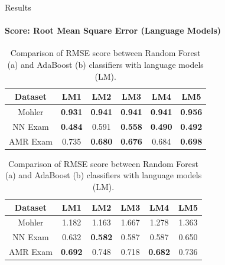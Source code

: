 \documentclass[aspectratio=169]{beamer}
\begin{document}
\begin{frame}{Results}
\framesubtitle{Score: Root Mean Square Error (Language Models)}
\begin{table}
\begin{subtable}[c]{0.5\textwidth}
	\centering
	\begin{tabular}{|c|c|c|c|c|c|}
		\hline
		Dataset & LM1 & LM2 & LM3 & LM4 & LM5 \\
		\hline
		Mohler &\textbf{0.931}& \textbf{0.941}& \textbf{0.941}& \textbf{0.941}& \textbf{0.956}\\
		\hline
		NN Exam &\textbf{0.484}& {0.591}& \textbf{0.558}& \textbf{0.490}& \textbf{0.492}\\
		\hline
		AMR Exam &0.735& \textbf{0.680}& \textbf{0.676}& 0.684& \textbf{0.698}\\
		\hline
	\end{tabular}
	\subcaption{}
\end{subtable}
\begin{subtable}[c]{0.5\textwidth}
	\centering
	\begin{tabular}{|c|c|c|c|c|c|}
		\hline
		Dataset & LM1 & LM2 & LM3 & LM4 & LM5 \\
		\hline
		Mohler &1.182& 1.163& 1.667& 1.278& 1.363 \\
		\hline
		NN Exam &0.632& \textbf{0.582}& 0.587& 0.587& 0.650\\
		\hline
		AMR Exam &\textbf{0.692}& 0.748& 0.718& \textbf{0.682}& 0.736\\
		\hline
	\end{tabular}	
	\subcaption{}
\end{subtable}
\caption{Comparison of RMSE score between Random Forest (a) and AdaBoost (b) classifiers with language models (LM).}
\end{table}
\end{frame}
\end{document}
